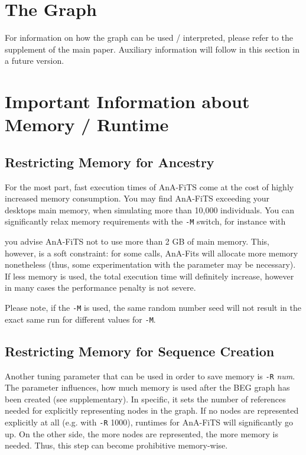 \documentclass{scrartcl}
\newcommand{\console}[1]{\newline {\footnotesize \texttt{\$ #1}} \newline}
\newcommand{\prog}[1]{\texttt{#1}}
\begin{document}
\section{The Graph}
\label{sec:graph}

For information on how the graph can be used / interpreted, please
refer to the supplement of the main paper. Auxiliary information will
follow in this section in a future version.


\section{Important Information about Memory  / Runtime }
\label{sec:some-notes-runtime}

\subsection{Restricting Memory for Ancestry  }
\label{sec:restr-memory-ancestr}
For the most part, fast execution times of AnA-FiTS come at the cost
of highly increased memory consumption. You may find AnA-FiTS
exceeding your desktops main memory, when simulating more than 10,000
individuals. You can significantly relax memory requirements with the
\prog{-M} switch, for instance with \console{
  ./AnA-FiTS-v0.9-1-gfc23a8c -n myRun -s 3 -M 2G }

you advise AnA-FiTS not to use more than 2 GB of main memory. This,
however, is a soft constraint: for some calls, AnA-Fits will allocate
more memory nonetheless (thus, some experimentation with the parameter
may be necessary). If less memory is used, the total execution time
will definitely increase, however in many cases the performance
penalty is not severe.

Please note, if the \prog{-M} is used, the same random number seed
will not result in the exact same run for different values for
\prog{-M}. 

\subsection{Restricting Memory for Sequence Creation}
\label{sec:restr-memory-sequ}

Another tuning parameter that can be used in order to save memory is
\prog{-R} \textit{num}. The parameter influences, how much memory is
used after the BEG graph has been created (see supplementary). In
specific, it sets the number of references needed for explicitly
representing nodes in the graph. If no nodes are represented
explicitly at all (e.g. with \prog{-R} 1000), runtimes for AnA-FiTS will
significantly go up. On the other side, the more nodes are
represented, the more memory is needed. Thus, this step can become
prohibitive memory-wise. 
\end{document}
